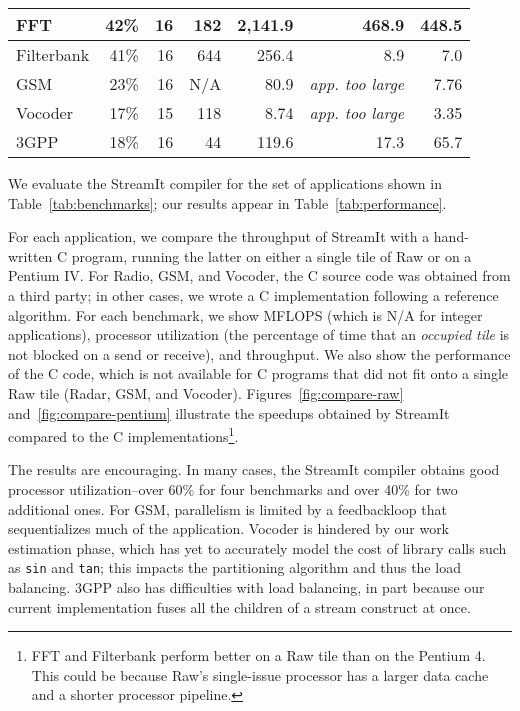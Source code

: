 \begin{table*}[!t]
\begin{center}
\begin{tabular}{|l||r|r|r|r||r||r||}
FFT    & 42\% & 16  & 182 &  2,141.9 & 468.9 & 448.5  \\ \hline
Filterbank & 
       41\% & 16  &  644 &   256.4  & 8.9 & 7.0   \\ \hline
GSM    & 23\% & 16 & N/A &    80.9  & {\it app. too large} & 7.76 \\ \hline
Vocoder& 17\% & 15  & 118 &     8.74  & {\it app. too large} & 3.35  \\ \hline
3GPP   & 18\% & 16  & 44 &   119.6  & 17.3  & 65.7   \\ \hline \hline
\end{tabular}
\caption{\protect\small Performance Results.}
\label{tab:performance}
\end{center}
\end{table*}

We evaluate the StreamIt compiler for the set of applications shown in
Table~\ref{tab:benchmarks}; our results appear in
Table~\ref{tab:performance}.

For each application, we compare the throughput of StreamIt with a
hand-written C program, running the latter on either a single tile of
Raw or on a Pentium IV.  For Radio, GSM, and Vocoder, the C source
code was obtained from a third party; in other cases, we wrote a C
implementation following a reference algorithm.  For each benchmark,
we show MFLOPS (which is N/A for integer applications), processor
utilization (the percentage of time that an {\it occupied tile} is not
blocked on a send or receive), and throughput.  We also show the
performance of the C code, which is not available for C programs that
did not fit onto a single Raw tile (Radar, GSM, and Vocoder).
Figures~\ref{fig:compare-raw} and~\ref{fig:compare-pentium} illustrate
the speedups obtained by StreamIt compared to the C
implementations\footnote{FFT and Filterbank perform better on a Raw
tile than on the Pentium 4.  This could be because Raw's single-issue
processor has a larger data cache and a shorter processor pipeline.}.

The results are encouraging.  In many cases, the StreamIt compiler
obtains good processor utilization--over 60\% for four benchmarks and
over 40\% for two additional ones.  For GSM, parallelism is limited by
a feedbackloop that sequentializes much of the application.  Vocoder
is hindered by our work estimation phase, which has yet to accurately
model the cost of library calls such as {\tt sin} and {\tt tan}; this
impacts the partitioning algorithm and thus the load balancing.  3GPP
also has difficulties with load balancing, in part because our current
implementation fuses all the children of a stream construct at once.

